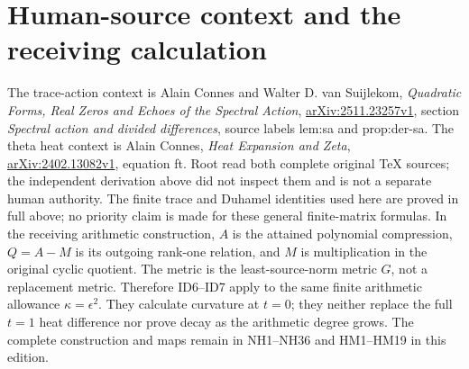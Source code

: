 \documentclass[11pt]{article}
\begin{document}
\section*{Human-source context and the receiving calculation}
The trace-action context is Alain Connes and Walter D. van Suijlekom,
\emph{Quadratic Forms, Real Zeros and Echoes of the Spectral Action},
\href{https://arxiv.org/abs/2511.23257v1}{arXiv:2511.23257v1},
section \emph{Spectral action and divided differences},
source labels lem:sa and prop:der-sa.
The theta heat context is Alain Connes, \emph{Heat Expansion and Zeta},
\href{https://arxiv.org/abs/2402.13082v1}{arXiv:2402.13082v1},
equation ft. Root read both complete original TeX sources; the
independent derivation above did not inspect them and is not a separate
human authority. The finite trace and Duhamel identities used here are
proved in full above; no priority claim is made for these general
finite-matrix formulas.
In the receiving arithmetic construction, $A$ is the attained polynomial
compression, $Q=A-M$ is its outgoing rank-one relation, and $M$ is
multiplication in the original cyclic quotient. The metric is the
least-source-norm metric $G$, not a replacement metric. Therefore
ID6--ID7 apply to the same finite arithmetic allowance
$\kappa=\epsilon^2$. They calculate curvature at $t=0$; they neither
replace the full $t=1$ heat difference nor prove decay as the
arithmetic degree grows. The complete construction and maps remain in
NH1--NH36 and HM1--HM19 in this edition.
\end{document}
